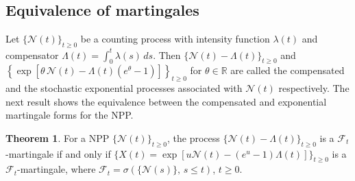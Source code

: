 \documentclass[11pt,oneside,reqno]{amsart}
\theoremstyle{definition}
\newtheorem{theorem}{\bf Theorem}[section]
\theoremstyle{remarkstyle}
\begin{document}
\subsection{Equivalence of martingales}
Let $\{\mathcal{N}(t)\}_{t \ge 0}$ be a counting process with intensity function $\lambda(t)$ and compensator $\Lambda(t) = \int_0^t \lambda(s)\,ds$. Then $\{\mathcal{N}(t) - \Lambda(t)\}_{t\ge 0}$ and $\left\{\exp\!\left[\theta\,\mathcal{N}(t) - \Lambda(t)(e^{\theta} - 1)\right]\right\}_{t\ge 0}$ for $\theta\in\mathbb{R}$ are called the compensated and the stochastic exponential processes associated with $\mathcal{N}(t)$ respectively. The next result shows the equivalence between the compensated and exponential martingale forms for the NPP.
\begin{theorem}\label{martingale_equivalence}
    For a NPP $\{\mathcal{N}(t)\}_{t\ge 0}$, the process $\{\mathcal{N}(t)-\Lambda(t)\}_{t\ge 0}$ is a $\mathcal{F}_t$-martingale if and only if $\{X(t)=\exp[u\mathcal{N}(t)-(e^u-1)\Lambda(t)]\}_{t\ge 0}$ is a $\mathcal{F}_t$-martingale, where $\mathcal{F}_t=\sigma(\{\mathcal{N}(s)\},\,s\le t)$, $t\ge 0$.
\end{theorem}
\end{document}
